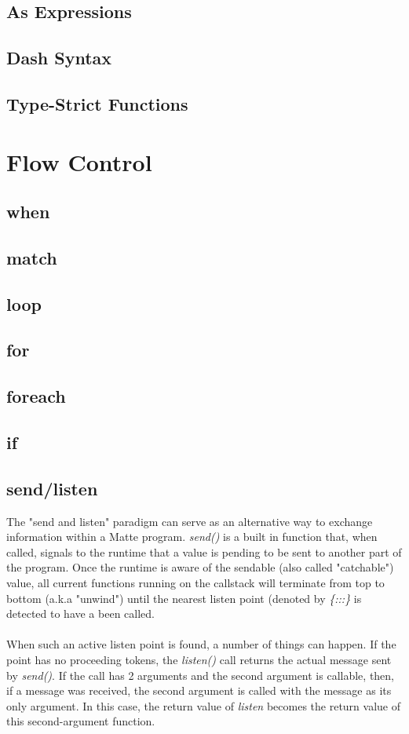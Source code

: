 \documentclass[12pt,letterpaper]{report}
\begin{document}
\section{As Expressions}\label{As Expressions}
\section{Dash Syntax}\label{Dash Syntax}
\section{Type-Strict Functions}\label{Type-Strict Functions}
\chapter{Flow Control}\label{Flow Control}
\section{when}\label{when}
\section{match}\label{match}
\section{loop}\label{loop}
\section{for}\label{for}
\section{foreach}\label{foreach}
\section{if}\label{if}
\section{send/listen}\label{send/listen}

The "send and listen" paradigm can serve as an alternative way to exchange information within 
a Matte program. \textit{send()} is a built in function that, when called, signals to the runtime
that a value is pending to be sent to another part of the program. Once the runtime is aware of 
the sendable (also called "catchable") value, all current functions running on the callstack 
will terminate from top to bottom (a.k.a "unwind") until the nearest listen point
(denoted by \textit{\{:::\}} is detected to have a been called.
\\\\
When such an active listen point is found, a number of things can happen.
If the point has no proceeding tokens, the \textit{listen()} call returns 
the actual message sent by \textit{send()}. If the call has 2 arguments and the second 
argument is callable, then, if a message was received, the second argument is called 
with the message as its only argument. In this case, the return value of \textit{listen} 
becomes the return value of this second-argument function.
\end{document}
